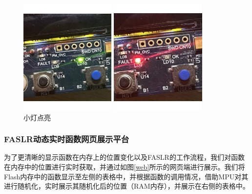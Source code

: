 \documentclass[UTF8,12pt,a4paper,twoside]{ctexart}
\numberwithin{figure}{section}
\begin{document}
\begin{figure}[htbp]
    \centering
    \begin{minipage}[t]{0.4\textwidth} %
        \centering
        \includegraphics[scale=1]{graph/Light_up1.png}
    \end{minipage}
    \hspace{0.3in} %
    \begin{minipage}[t]{0.4\textwidth}%
        \centering
        \includegraphics[scale=1]{graph/Light_up2.png}
    \end{minipage}
    \caption{小灯点亮}
    \label{LightUp}
\end{figure}

\subsubsection{FASLR动态实时函数网页展示平台}
\par 为了更清晰的显示函数在内存上的位置变化以及FASLR的工作流程，我们对函数在内存中的位置进行实时获取，并通过如图\ref{web}所示的网页端进行展示。我们将Flash内存中的函数显示至左侧的表格中，并根据函数的调用情况，借助MPU对其进行随机化，实时展示其随机化后的位置（RAM内存），并展示在右侧的表格中。
\end{document}
